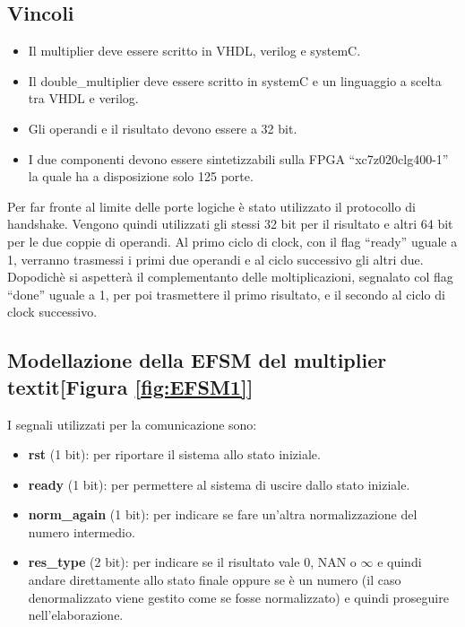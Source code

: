 \documentclass[]{IEEEtran}
\begin{document}
\subsection{Vincoli}
\begin{itemize}
    \item Il multiplier deve essere scritto in VHDL, verilog e systemC.
    \item Il double\_multiplier deve essere scritto in systemC e un linguaggio a scelta tra VHDL e verilog.
    \item Gli operandi e il risultato devono essere a 32 bit.
    \item I due componenti devono essere sintetizzabili sulla FPGA ``xc7z020clg400-1'' la quale ha a disposizione solo 125 porte.
\end{itemize}
Per far fronte al limite delle porte logiche è stato utilizzato il protocollo di handshake. Vengono quindi utilizzati gli stessi 32 bit per il risultato e altri 64 bit per le due coppie di operandi. Al primo ciclo di clock, con il flag ``ready'' uguale a 1, verranno trasmessi i primi due operandi e al ciclo successivo gli altri due. Dopodichè si aspetterà il complementanto delle moltiplicazioni, segnalato col flag ``done'' uguale a 1, per poi trasmettere il primo risultato, e il secondo al ciclo di clock successivo.

\subsection{Modellazione della EFSM del multiplier textit{[Figura \ref{fig:EFSM1}]}}
I segnali utilizzati per la comunicazione sono:
\begin{itemize}
    \item \textbf{rst} (1 bit): per riportare il sistema allo stato iniziale.
    \item \textbf{ready} (1 bit): per permettere al sistema di uscire dallo stato iniziale.
    \item \textbf{norm\_again} (1 bit): per indicare se fare un'altra normalizzazione del numero intermedio.
    \item \textbf{res\_type} (2 bit): per indicare se il risultato vale 0, NAN o \(\infty\) e quindi andare direttamente allo stato finale oppure se è un numero (il caso denormalizzato viene gestito come se fosse normalizzato) e quindi proseguire nell'elaborazione.
\end{itemize}
\end{document}
